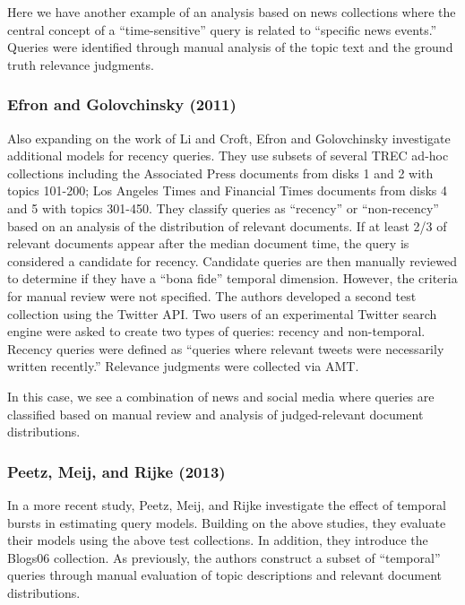 \documentclass{sig-alternate}
\begin{document}
Here we have another example of an analysis based on news collections where the central concept of a ``time-sensitive'' query is related to ``specific news events.'' Queries were identified through manual analysis of the topic text and the ground truth relevance judgments.

\subsubsection{Efron and Golovchinsky (2011)}
Also expanding on the work of Li and Croft, Efron and Golovchinsky \cite{Efron2011} investigate additional models for recency queries.  They use subsets of several TREC ad-hoc collections including the Associated Press documents from disks 1 and 2 with topics 101-200; Los Angeles Times and Financial Times documents from disks 4 and 5 with topics 301-450.  They classify queries as ``recency'' or ``non-recency'' based on an analysis of the distribution of relevant documents. If at least 2/3 of relevant documents appear after the median document time, the query is considered a candidate for recency.  Candidate queries are then manually reviewed to determine if they have a ``bona fide'' temporal dimension. However, the criteria for manual review were not specified.   The authors developed a second test collection using the Twitter API.  Two users of an experimental Twitter search engine were asked to create two types of queries: recency and non-temporal. Recency queries were defined as ``queries where relevant tweets were necessarily written recently.''  Relevance judgments were collected via AMT.  

In this case, we see a combination of news and social media where queries are classified based on manual review and analysis of judged-relevant document distributions.

\subsubsection{Peetz, Meij, and Rijke (2013)}

In a more recent study, Peetz, Meij, and Rijke \cite{Peetz2013} investigate the effect of temporal bursts in estimating query models. Building on the above studies, they evaluate their models using the above test collections. In addition, they introduce the Blogs06 collection.  As previously, the authors construct a subset of ``temporal'' queries through manual evaluation of topic descriptions and relevant document distributions. 
\end{document}
